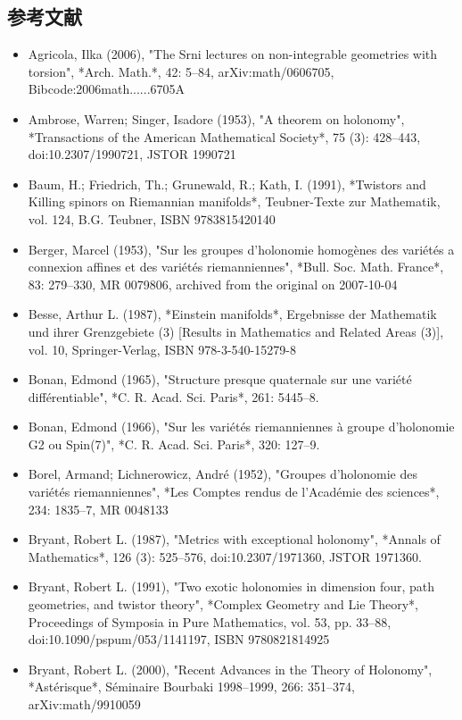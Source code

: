 \subsection{参考文献}
\begin{itemize}
\item Agricola, Ilka (2006), "The Srni lectures on non-integrable geometries with torsion", *Arch. Math.*, 42: 5–84, arXiv:math/0606705, Bibcode:2006math......6705A  
\item Ambrose, Warren; Singer, Isadore (1953), "A theorem on holonomy", *Transactions of the American Mathematical Society*, 75 (3): 428–443, doi:10.2307/1990721, JSTOR 1990721  
\item Baum, H.; Friedrich, Th.; Grunewald, R.; Kath, I. (1991), *Twistors and Killing spinors on Riemannian manifolds*, Teubner-Texte zur Mathematik, vol. 124, B.G. Teubner, ISBN 9783815420140  
\item Berger, Marcel (1953), "Sur les groupes d'holonomie homogènes des variétés a connexion affines et des variétés riemanniennes", *Bull. Soc. Math. France*, 83: 279–330, MR 0079806, archived from the original on 2007-10-04  
\item Besse, Arthur L. (1987), *Einstein manifolds*, Ergebnisse der Mathematik und ihrer Grenzgebiete (3) [Results in Mathematics and Related Areas (3)], vol. 10, Springer-Verlag, ISBN 978-3-540-15279-8  
\item Bonan, Edmond (1965), "Structure presque quaternale sur une variété différentiable", *C. R. Acad. Sci. Paris*, 261: 5445–8.  
\item Bonan, Edmond (1966), "Sur les variétés riemanniennes à groupe d'holonomie G2 ou Spin(7)", *C. R. Acad. Sci. Paris*, 320: 127–9.  
\item Borel, Armand; Lichnerowicz, André (1952), "Groupes d'holonomie des variétés riemanniennes", *Les Comptes rendus de l'Académie des sciences*, 234: 1835–7, MR 0048133  
\item Bryant, Robert L. (1987), "Metrics with exceptional holonomy", *Annals of Mathematics*, 126 (3): 525–576, doi:10.2307/1971360, JSTOR 1971360.  
\item Bryant, Robert L. (1991), "Two exotic holonomies in dimension four, path geometries, and twistor theory", *Complex Geometry and Lie Theory*, Proceedings of Symposia in Pure Mathematics, vol. 53, pp. 33–88, doi:10.1090/pspum/053/1141197, ISBN 9780821814925
\item Bryant, Robert L. (2000), "Recent Advances in the Theory of Holonomy", *Astérisque*, Séminaire Bourbaki 1998–1999, 266: 351–374, arXiv:math/9910059  

\end{itemize}
